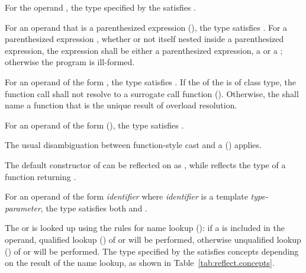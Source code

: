 \begin{std.txt}
For the operand \tcode{::}, the type specified by the
 satisfies .

For an operand that is a parenthesized expression (),
the type satisfies \linebreak{}.  For a
parenthesized expression , whether or not itself nested inside a
parenthesized expression, the expression  shall be either a
parenthesized expression, a  or a
; otherwise the program is
ill-formed.

For an operand of the form , the type
satisfies \linebreak{}.  If the
 of the 
is of class type, the function call shall not resolve to a surrogate call
function (). Otherwise, the
 shall name a function that is the unique result
of overload resolution.

For an operand of the form 
(), the type satisfies \linebreak{}.
\begin{note}
The usual disambiguation between function-style cast and a
 () applies.
\begin{example}
The default constructor of  can be reflected on as
, while  reflects the type of a
function returning .
\end{example}
\end{note}

For an
operand of the form \emph{identifier} where \emph{identifier} is a template
\emph{type-parameter}, the type satisfies both  and
.


The  or  is looked up
using the rules for name lookup (): if a
 is included in the operand, qualified lookup
() of  or
 will be performed,
otherwise unqualified lookup () of
 or  will be performed.
The type specified by the  satisfies concepts
depending on the result of the name lookup, as shown in
Table~\ref{tab:reflect.concepts}.


\end{std.txt}
